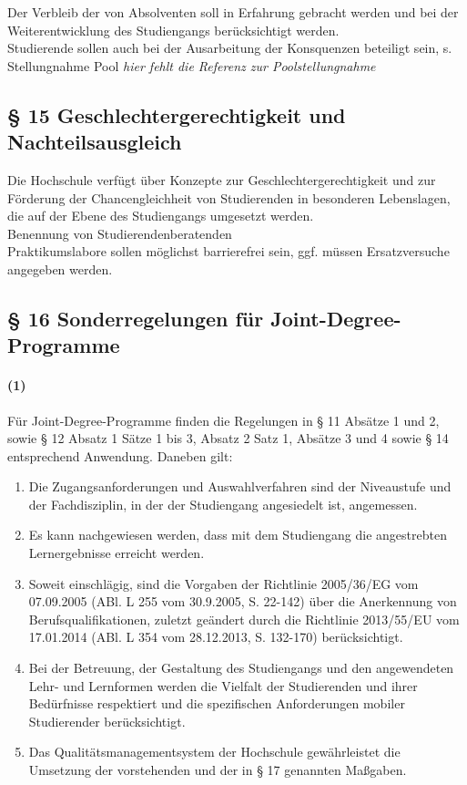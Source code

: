 \documentclass[a4paper]{scrartcl}
\begin{document}
\textcolor{Bernd}{\textbf{\cite{PROT: WiSe2015-RL}} Der Verbleib der von Absolventen soll in Erfahrung gebracht werden und bei der Weiterentwicklung des Studiengangs berücksichtigt werden.}\\

\textcolor{Bernd}{Studierende sollen auch bei der Ausarbeitung der Konsquenzen beteiligt sein, s. Stellungnahme Pool}
\textcolor{Brutus}{\emph{hier fehlt die Referenz zur Poolstellungnahme}}

\subsection{§ 15 Geschlechtergerechtigkeit und Nachteilsausgleich}
Die Hochschule verfügt über Konzepte zur Geschlechtergerechtigkeit und zur Förderung der Chancengleichheit von Studierenden in besonderen Lebenslagen, die auf der Ebene des Studiengangs umgesetzt werden.\\

\textcolor{Bernd}{\textbf{\cite{PROT: WiSe2015-RL}} Benennung von Studierendenberatenden}\\

\textcolor{Bernd}{\textbf{\cite{PROT: WiSe2015-RL}} Praktikumslabore sollen möglichst barrierefrei sein, ggf. müssen Ersatzversuche angegeben werden.}\\

\subsection{§ 16 Sonderregelungen für Joint-Degree-Programme}
\paragraph{(1)} Für Joint-Degree-Programme finden die Regelungen in § 11 Absätze 1
und 2, sowie § 12 Absatz 1 Sätze 1 bis 3, Absatz 2 Satz 1, Absätze 3 und 4
sowie § 14 entsprechend Anwendung. Daneben gilt:
\begin{enumerate}
\item Die Zugangsanforderungen und Auswahlverfahren sind der Niveaustufe und der Fachdisziplin, in der der Studiengang angesiedelt ist, angemessen.
\item Es kann nachgewiesen werden, dass mit dem Studiengang die angestrebten Lernergebnisse erreicht werden.
\item Soweit einschlägig, sind die Vorgaben der Richtlinie 2005/36/EG vom 07.09.2005 (ABl. L 255 vom 30.9.2005, S. 22-142) über die Anerkennung von Berufsqualifikationen, zuletzt geändert durch die Richtlinie 2013/55/EU vom 17.01.2014 (ABl. L 354 vom 28.12.2013, S. 132-170) berücksichtigt.
\item Bei der Betreuung, der Gestaltung des Studiengangs und den angewendeten Lehr- und Lernformen werden die Vielfalt der Studierenden und ihrer Bedürfnisse respektiert und die spezifischen Anforderungen mobiler Studierender berücksichtigt.
\item  Das Qualitätsmanagementsystem der Hochschule gewährleistet die
Umsetzung der vorstehenden und der in § 17 genannten Maßgaben.
\end{enumerate}
\end{document}
